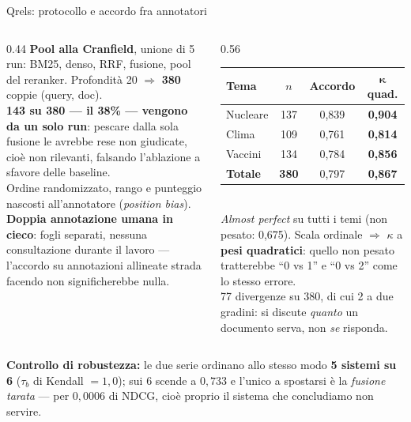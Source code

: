 \documentclass[aspectratio=169,11pt]{beamer}
\begin{document}
\begin{frame}{Qrels: protocollo e accordo fra annotatori}
  \begin{columns}[T]
    \begin{column}{0.44\textwidth}
      \footnotesize
      \textbf{Pool alla Cranfield}, unione di \alert{5 run}: BM25, denso, RRF, fusione,
      pool del reranker. Profondità 20 $\Rightarrow$ \textbf{380} coppie (query, doc).\\[0.4em]
      \textbf{143 su 380 --- il 38\% --- vengono da un solo run}: pescare dalla sola
      fusione le avrebbe rese non giudicate, cioè non rilevanti, falsando l'ablazione a
      sfavore delle baseline.\\[0.4em]
      Ordine randomizzato, rango e punteggio \alert{nascosti} all'annotatore
      (\emph{position bias}).\\[0.4em]
      \textbf{Doppia annotazione umana in cieco}: fogli separati, nessuna consultazione
      durante il lavoro --- l'accordo su annotazioni allineate strada facendo non
      significherebbe nulla.
    \end{column}
    \begin{column}{0.56\textwidth}
      \centering\small
      \begin{tabular}{lccc}
        \toprule
        \textbf{Tema} & $n$ & Accordo & $\boldsymbol{\kappa}$ \textbf{quad.} \\
        \midrule
        Nucleare & 137 & 0,839 & \textbf{0,904} \\
        Clima    & 109 & 0,761 & \textbf{0,814} \\
        Vaccini  & 134 & 0,784 & \textbf{0,856} \\
        \midrule
        \textbf{Totale} & \textbf{380} & 0,797 & \textbf{0,867} \\
        \bottomrule
      \end{tabular}\\[0.5em]
      \footnotesize
      \emph{Almost perfect} su tutti i temi (non pesato: 0,675). Scala ordinale $\Rightarrow$
      $\kappa$ a \textbf{pesi quadratici}: quello non pesato tratterebbe ``0 vs 1'' e ``0 vs 2''
      come lo stesso errore.\\[0.3em]
      {\scriptsize\color{echoslate} 77 divergenze su 380, di cui \alert{2 a due gradini}: si
      discute \emph{quanto} un documento serva, non \emph{se} risponda.}
    \end{column}
  \end{columns}
  \vspace{0.3em}
  {\footnotesize\color{echogreen}\textbf{Controllo di robustezza:} le due serie ordinano allo stesso
  modo \textbf{5 sistemi su 6} ($\tau_b$ di Kendall $=1{,}0$); sui 6 scende a $0{,}733$ e l'unico a
  spostarsi è la \emph{fusione tarata} --- per $0{,}0006$ di NDCG, cioè proprio il sistema che
  concludiamo non servire.}
\end{frame}
\end{document}

